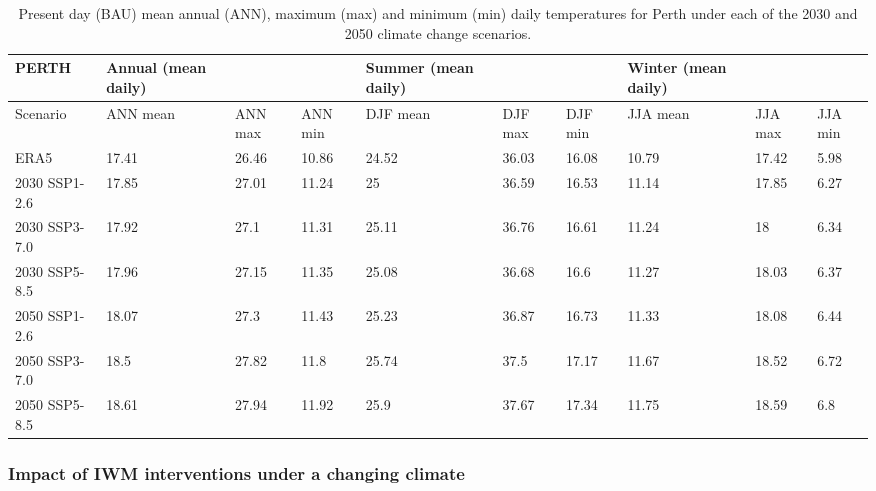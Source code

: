 \documentclass[utf8]{frontiersSCNS} %
\begin{document}
\setlength\arrayrulewidth{1pt} %
\begin{table}[!ht]\caption{Present day (BAU) mean annual (ANN), maximum (max) and minimum (min) daily temperatures for Perth under each of the 2030 and 2050 climate change scenarios.}
    \centering
    \small
    \begin{tabular}{|l|p{1.5cm}|p{1.1cm}|p{1.1cm}|p{1.5cm}|p{1.1cm}|p{1.1cm}|p{1.5cm}|p{1.1cm}|p{1.1cm}|}
    \hline
        PERTH & Annual (mean daily) \cellcolor{light-gray}& ~ \cellcolor{light-gray}& ~\cellcolor{light-gray}& Summer (mean daily)\cellcolor{yellow!25}& ~\cellcolor{yellow!25} & ~\cellcolor{yellow!25} & Winter (mean daily)  \cellcolor{light-blue!25} & ~ \cellcolor{light-blue!25}& ~ \cellcolor{light-blue!25}\\ \hline
        Scenario & ANN mean \cellcolor{light-gray}& ANN max \cellcolor{light-gray}& ANN min\cellcolor{light-gray} & DJF mean\cellcolor{yellow!25} & DJF max\cellcolor{yellow!25} & DJF min\cellcolor{yellow!25} & JJA mean \cellcolor{light-blue!25}& JJA max \cellcolor{light-blue!25}& JJA min \cellcolor{light-blue!25}\\ \hline
        ERA5 & 17.41 & 26.46 & 10.86 & 24.52 & 36.03 & 16.08 & 10.79 & 17.42 & 5.98 \\ \hline
        2030 SSP1-2.6 & 17.85 & 27.01 & 11.24 & 25 & 36.59 & 16.53 & 11.14 & 17.85 & 6.27 \\ \hline
        2030 SSP3-7.0 & 17.92 & 27.1 & 11.31 & 25.11 & 36.76 & 16.61 & 11.24 & 18 & 6.34 \\ \hline
        2030 SSP5-8.5 & 17.96 & 27.15 & 11.35 & 25.08 & 36.68 & 16.6 & 11.27 & 18.03 & 6.37 \\ \hline
        2050 SSP1-2.6 & 18.07 & 27.3 & 11.43 & 25.23 & 36.87 & 16.73 & 11.33 & 18.08 & 6.44 \\ \hline
        \rowcolor{light-green!25}2050 SSP3-7.0 & 18.5 & 27.82 & 11.8 & 25.74 & 37.5 & 17.17 & 11.67 & 18.52 & 6.72 \\ \hline
        2050 SSP5-8.5 & 18.61 & 27.94 & 11.92 & 25.9 & 37.67 & 17.34 & 11.75 & 18.59 & 6.8 \\ \hline
    \end{tabular}\label{table:perth}
\end{table}
\setlength\arrayrulewidth{0.4pt} %

\subsubsection{Impact of IWM interventions under a changing climate}\label{sec:results3b}
\end{document}
